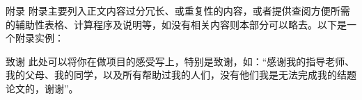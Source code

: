 \begin{textarea}{附录}
    附录主要列入正文内容过分冗长、或重复性的内容，或者提供查阅方便所需的辅助性表格、计算程序及说明等，如没有相关内容则本部分可以略去。以下是一个附录实例：
\end{textarea}
\newpage{}

\begin{textarea}{致谢}
    此处可以将你在做项目的感受写上，特别是致谢，如：“感谢我的指导老师、我的父母、我的同学，以及所有帮助过我的人们，没有他们我是无法完成我的结题论文的，谢谢”。
\end{textarea}

\newpage{}
\printbibliography{}